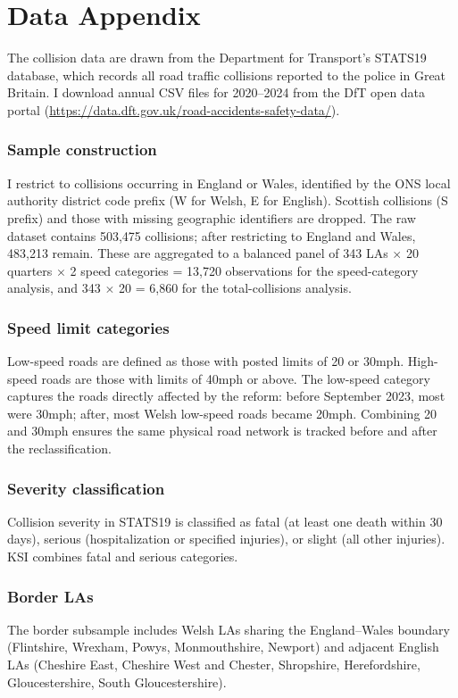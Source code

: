 \documentclass[12pt]{article}
\begin{document}
\newpage
\appendix

\section{Data Appendix}

The collision data are drawn from the Department for Transport's STATS19 database, which records all road traffic collisions reported to the police in Great Britain. I download annual CSV files for 2020--2024 from the DfT open data portal (\url{https://data.dft.gov.uk/road-accidents-safety-data/}).

\subsubsection*{Sample construction} I restrict to collisions occurring in England or Wales, identified by the ONS local authority district code prefix (W for Welsh, E for English). Scottish collisions (S prefix) and those with missing geographic identifiers are dropped. The raw dataset contains 503,475 collisions; after restricting to England and Wales, 483,213 remain. These are aggregated to a balanced panel of 343 LAs $\times$ 20 quarters $\times$ 2 speed categories = 13,720 observations for the speed-category analysis, and 343 $\times$ 20 = 6,860 for the total-collisions analysis.

\subsubsection*{Speed limit categories} Low-speed roads are defined as those with posted limits of 20 or 30mph. High-speed roads are those with limits of 40mph or above. The low-speed category captures the roads directly affected by the reform: before September 2023, most were 30mph; after, most Welsh low-speed roads became 20mph. Combining 20 and 30mph ensures the same physical road network is tracked before and after the reclassification.

\subsubsection*{Severity classification} Collision severity in STATS19 is classified as fatal (at least one death within 30 days), serious (hospitalization or specified injuries), or slight (all other injuries). KSI combines fatal and serious categories.

\subsubsection*{Border LAs} The border subsample includes Welsh LAs sharing the England--Wales boundary (Flintshire, Wrexham, Powys, Monmouthshire, Newport) and adjacent English LAs (Cheshire East, Cheshire West and Chester, Shropshire, Herefordshire, Gloucestershire, South Gloucestershire).
\end{document}
